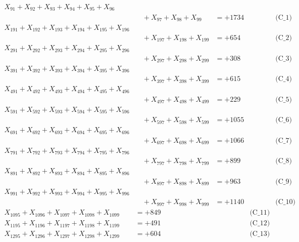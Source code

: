 \documentclass[a4paper,10pt]{article}
\begin{document}
\allowdisplaybreaks
{\small
\begin{align}
X_{91} + X_{92} + X_{93} + X_{94} + X_{95} + X_{96} \\[0.1ex]
&\quad  + X_{97} + X_{98} + X_{99} &= +1734 && \text{(C\_1)} \\
X_{191} + X_{192} + X_{193} + X_{194} + X_{195} + X_{196} \\[0.1ex]
&\quad  + X_{197} + X_{198} + X_{199} &= +654 && \text{(C\_2)} \\
X_{291} + X_{292} + X_{293} + X_{294} + X_{295} + X_{296} \\[0.1ex]
&\quad  + X_{297} + X_{298} + X_{299} &= +308 && \text{(C\_3)} \\
X_{391} + X_{392} + X_{393} + X_{394} + X_{395} + X_{396} \\[0.1ex]
&\quad  + X_{397} + X_{398} + X_{399} &= +615 && \text{(C\_4)} \\
X_{491} + X_{492} + X_{493} + X_{494} + X_{495} + X_{496} \\[0.1ex]
&\quad  + X_{497} + X_{498} + X_{499} &= +229 && \text{(C\_5)} \\
\allowbreak
X_{591} + X_{592} + X_{593} + X_{594} + X_{595} + X_{596} \\[0.1ex]
&\quad  + X_{597} + X_{598} + X_{599} &= +1055 && \text{(C\_6)} \\
X_{691} + X_{692} + X_{693} + X_{694} + X_{695} + X_{696} \\[0.1ex]
&\quad  + X_{697} + X_{698} + X_{699} &= +1066 && \text{(C\_7)} \\
X_{791} + X_{792} + X_{793} + X_{794} + X_{795} + X_{796} \\[0.1ex]
&\quad  + X_{797} + X_{798} + X_{799} &= +899 && \text{(C\_8)} \\
X_{891} + X_{892} + X_{893} + X_{894} + X_{895} + X_{896} \\[0.1ex]
&\quad  + X_{897} + X_{898} + X_{899} &= +963 && \text{(C\_9)} \\
X_{991} + X_{992} + X_{993} + X_{994} + X_{995} + X_{996} \\[0.1ex]
&\quad  + X_{997} + X_{998} + X_{999} &= +1140 && \text{(C\_10)} \\
\allowbreak
X_{1095} + X_{1096} + X_{1097} + X_{1098} + X_{1099} &= +849 && \text{(C\_11)} \\
X_{1195} + X_{1196} + X_{1197} + X_{1198} + X_{1199} &= +491 && \text{(C\_12)} \\
X_{1295} + X_{1296} + X_{1297} + X_{1298} + X_{1299} &= +604 && \text{(C\_13)} \\

\end{align}}
\end{document}
